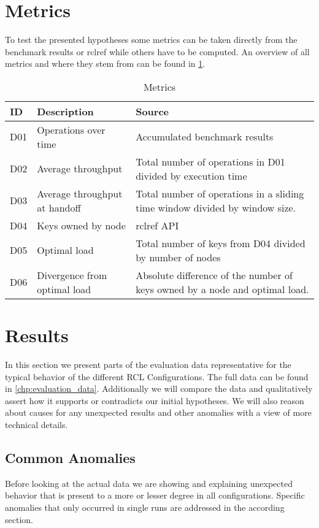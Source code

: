 \section{Metrics}
To test the presented hypotheses some metrics can be taken directly from the benchmark results or rclref while others have to be computed.
An overview of all metrics and where they stem from can be found in \cref{tab:metrics}.

\begin{table}
\begin{tabularx}{\textwidth}{|l|X|X|}
\hline
ID & Description & Source\\\hline
D01 & Operations over time & Accumulated benchmark results\\
D02 & Average throughput & Total number of operations in D01 divided by execution time\\
D03 & Average throughput at handoff & Total number of operations in a sliding time window divided by window size.\\
D04 & Keys owned by node & rclref API\\
D05 & Optimal load & Total number of keys from D04 divided by number of nodes\\
D06 & Divergence from optimal load & Absolute difference of the number of keys owned by a node and optimal load.\\\hline

\end{tabularx}
\caption[Metrics]{Metrics}
\label{tab:metrics}
\end{table}


\section{Results}
In this section we present parts of the evaluation data representative for the typical behavior of the different \ac{RCL} Configurations.
The full data can be found in \cref{chp:evaluation_data}.
Additionally we will compare the data and qualitatively assert how it supports or contradicts our initial hypotheses.
We will also reason about causes for any unexpected results and other anomalies with a view of more technical details.

\subsection{Common Anomalies}
Before looking at the actual data we are showing and explaining unexpected behavior that is present to a more or lesser degree in all configurations.
Specific anomalies that only occurred in single runs are addressed in the according section.

